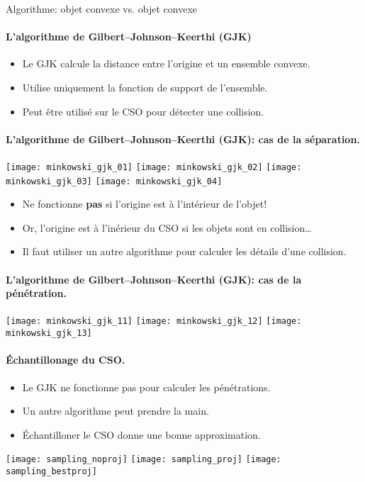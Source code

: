 \begin{frame}{Algorithme: objet convexe vs. objet convexe}
     {
        \framesubtitle{L’algorithme de Gilbert–Johnson–Keerthi (GJK)}
        \begin{itemize}
            \item Le GJK calcule la distance entre l’origine et un ensemble convexe.
            \item Utilise uniquement la fonction de support de l’ensemble.
            \item Peut être utilisé sur le CSO pour détecter une collision.
        \end{itemize}
    }
     {
        \framesubtitle{L’algorithme de Gilbert–Johnson–Keerthi (GJK): cas de la séparation.}
    }
     {
        \centering
        \texttt{[image: minkowski\_gjk\_01]}
    }
     {
        \centering
        \texttt{[image: minkowski\_gjk\_02]}
    }
     {
        \centering
        \texttt{[image: minkowski\_gjk\_03]}
    }
     {
        \centering
        \texttt{[image: minkowski\_gjk\_04]}
    }
     {
        \begin{itemize}
            \item Ne fonctionne \textbf{pas} si l’origine est à l’intérieur de
                l’objet!
            \item Or, l’origine est à l’inérieur du CSO si les objets sont en
                collision…
            \item Il faut utiliser un autre algorithme pour calculer les
                détails d’une collision.
        \end{itemize}
    }
     {
        \framesubtitle{L’algorithme de Gilbert–Johnson–Keerthi (GJK): cas de la pénétration.}
    }
     {
        \centering
        \texttt{[image: minkowski\_gjk\_11]}
    }
     {
        \centering
        \texttt{[image: minkowski\_gjk\_12]}
    }
     {
        \centering
        \texttt{[image: minkowski\_gjk\_13]}
    }
     {
        \framesubtitle{Échantillonage du CSO.}
    }
     {
        \begin{itemize}
            \item Le GJK ne fonctionne pas pour calculer les pénétrations.
            \item Un autre algorithme peut prendre la main.
            \item Échantilloner le CSO donne une bonne approximation.
        \end{itemize}
    }
     {
        \centering
        \texttt{[image: sampling\_noproj]}
    }
     {
        \centering
        \texttt{[image: sampling\_proj]}
    }
     {
        \centering
        \texttt{[image: sampling\_bestproj]}
    }
\end{frame}

